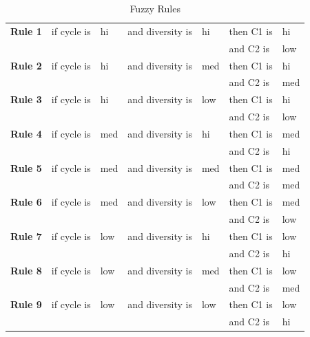 \documentclass[runningheads]{llncs}
\begin{document}
\begin{table}[htbp] 
\caption{Fuzzy Rules}\label{tab:fuzzy_rules}
\setlength{\tabcolsep}{8pt}
\begin{tabular}{l l l l l l l}
\hline
\textbf{Rule 1}  & if cycle is & hi & and diversity is & hi & then C1 is & hi  \\
                 &             &    &                  &    & and C2 is  & low \\ \hline
\textbf{Rule 2}  & if cycle is & hi & and diversity is & med & then C1 is & hi  \\
                 &             &    &                  &    & and C2 is  & med \\ \hline
\textbf{Rule 3}  & if cycle is & hi & and diversity is & low & then C1 is & hi  \\
                 &             &    &                  &    & and C2 is  & low \\ \hline
\textbf{Rule 4}  & if cycle is & med & and diversity is & hi & then C1 is & med  \\
                 &             &    &                  &    & and C2 is  & hi \\ \hline
\textbf{Rule 5}  & if cycle is & med & and diversity is & med & then C1 is & med  \\
                 &             &    &                  &    & and C2 is  & med \\ \hline
\textbf{Rule 6}  & if cycle is & med & and diversity is & low & then C1 is & med  \\
                 &             &    &                  &    & and C2 is  & low \\ \hline
\textbf{Rule 7}  & if cycle is & low & and diversity is & hi & then C1 is & low  \\
                 &             &    &                  &    & and C2 is  & hi \\ \hline
\textbf{Rule 8}  & if cycle is & low & and diversity is & med & then C1 is & low  \\
                 &             &    &                  &    & and C2 is  & med \\ \hline
\textbf{Rule 9}  & if cycle is & low & and diversity is & low & then C1 is & low  \\
                 &             &    &                  &    & and C2 is  & hi \\ \hline

\end{tabular}
\end{table}
\end{document}
